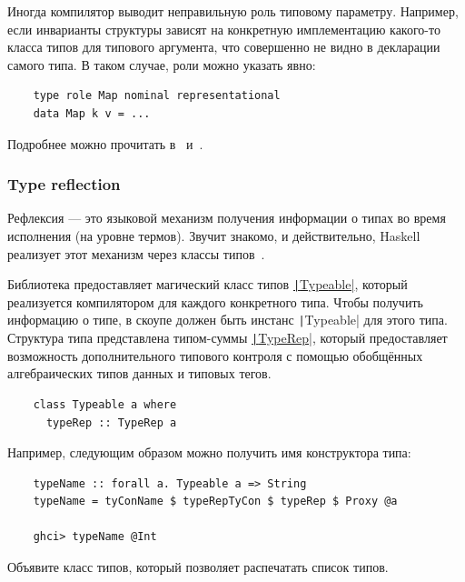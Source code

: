 Иногда компилятор выводит неправильную роль типовому параметру.
Например, если инварианты структуры зависят на конкретную имплементацию какого-то класса типов для типового аргумента, что совершенно не видно в декларации самого типа.
В таком случае, роли можно указать явно:
\begin{verbatim}
    type role Map nominal representational
    data Map k v = ...
\end{verbatim}

Подробнее можно прочитать в~\cite{breitner2014safe} и~\cite[глава 8]{maguire-types}.


\subsubsection{Type reflection} \label{subsubsec:type-reflection}

Рефлексия --- это языковой механизм получения информации о типах во время исполнения (на уровне термов).
Звучит знакомо, и действительно, Haskell реализует этот механизм через классы типов~\cite{peyton2016reflection}.

Библиотека предоставляет магический класс типов \href{https://hackage.haskell.org/package/base-4.20.0.1/docs/Type-Reflection.html}{\texttt|Typeable|}, который реализуется компилятором для каждого конкретного типа.
Чтобы получить информацию о типе, в скоупе должен быть инстанс \texttt|Typeable| для этого типа.
Структура типа представлена типом-суммы \href{https://hackage.haskell.org/package/ghc-internal-9.1001.0/docs/src/GHC.Internal.Data.Typeable.Internal.html#TypeRep}{\texttt|TypeRep|}, который предоставляет возможность дополнительного типового контроля с помощью обобщённых алгебраических типов данных и типовых тегов.
\begin{verbatim}
    class Typeable a where
      typeRep :: TypeRep a
\end{verbatim}

Например, следующим образом можно получить имя конструктора типа:
\begin{verbatim}
    typeName :: forall a. Typeable a => String
    typeName = tyConName $ typeRepTyCon $ typeRep $ Proxy @a

    ghci> typeName @Int
\end{verbatim}

\begin{task}
    Объявите класс типов, который позволяет распечатать список типов.
\end{task}

